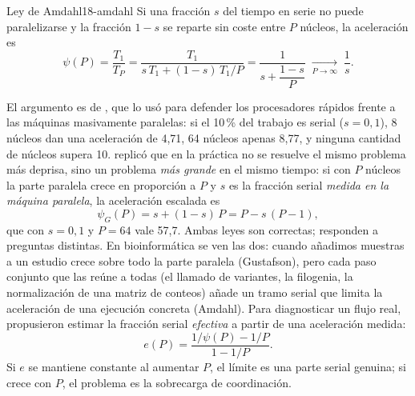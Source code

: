 \begin{teorema}{Ley de Amdahl}{18-amdahl}
Si una fracción $s$ del tiempo en serie no puede paralelizarse y la fracción $1-s$ se reparte sin coste entre $P$ núcleos, la aceleración es
\begin{equation}\label{eq:18-amdahl}
\psi(P) = \frac{T_1}{T_P} = \frac{T_1}{s\,T_1 + (1-s)\,T_1/P} = \frac{1}{s + \dfrac{1-s}{P}}\;\xrightarrow[P\to\infty]{}\;\frac{1}{s}.
\end{equation}
\end{teorema}

\begin{simbolos}
\end{simbolos}

El argumento es de \textcite{c18-amdahl1967}, que lo usó para defender los procesadores rápidos frente a las máquinas masivamente paralelas: si el 10\,\% del trabajo es serial ($s=0{,}1$), 8 núcleos dan una aceleración de 4,71, 64 núcleos apenas 8,77, y ninguna cantidad de núcleos supera 10. \textcite{c18-gustafson1988} replicó que en la práctica no se resuelve el mismo problema más deprisa, sino un problema \emph{más grande} en el mismo tiempo: si con $P$ núcleos la parte paralela crece en proporción a $P$ y $s$ es la fracción serial \emph{medida en la máquina paralela}, la aceleración escalada es
\begin{equation}\label{eq:18-gustafson}
\psi_G(P) = s + (1-s)\,P = P - s\,(P-1),
\end{equation}
que con $s=0{,}1$ y $P=64$ vale 57,7. Ambas leyes son correctas; responden a preguntas distintas. En bioinformática se ven las dos: cuando añadimos muestras a un estudio crece sobre todo la parte paralela (Gustafson), pero cada paso conjunto que las reúne a todas (el llamado de variantes, la filogenia, la normalización de una matriz de conteos) añade un tramo serial que limita la aceleración de una ejecución concreta (Amdahl). Para diagnosticar un flujo real, \textcite{c18-karp1990} propusieron estimar la fracción serial \emph{efectiva} a partir de una aceleración medida:
\begin{equation}\label{eq:18-karpflatt}
e(P) = \frac{1/\psi(P) - 1/P}{1 - 1/P}.
\end{equation}
Si $e$ se mantiene constante al aumentar $P$, el límite es una parte serial genuina; si crece con $P$, el problema es la sobrecarga de coordinación.

